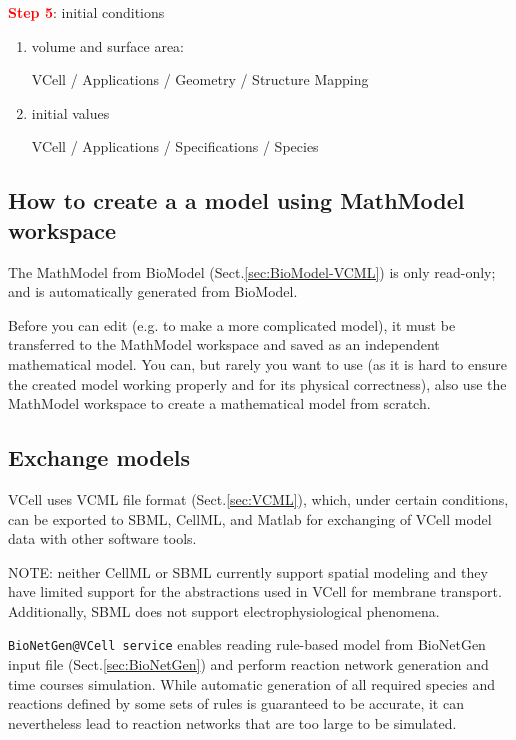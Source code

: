 \textcolor{red}{\bf Step 5}: initial conditions
\begin{enumerate}
  \item volume and surface area: 
  
VCell / Applications / Geometry / Structure Mapping

  \item initial values
  
VCell / Applications / Specifications / Species
\end{enumerate}


\subsection{How to create a a model using MathModel workspace}

The MathModel from BioModel (Sect.\ref{sec:BioModel-VCML}) is only read-only;
and is automatically generated from BioModel.

Before you can edit (e.g. to make a more complicated model), it must be
transferred to the MathModel workspace and saved as an independent mathematical
model. You can, but rarely you want to use (as it is hard to ensure the created
model working properly and for its physical correctness), also use the MathModel
workspace to create a mathematical model from scratch.




\subsection{Exchange models}

VCell uses VCML file format (Sect.\ref{sec:VCML}), which, under certain
conditions, can be exported to SBML, CellML, and Matlab for exchanging of VCell
model data with other software tools.

NOTE: neither CellML or SBML currently support spatial modeling and they have
limited support for the abstractions used in VCell for membrane transport.
Additionally, SBML does not support electrophysiological phenomena.

\verb!BioNetGen@VCell service! enables reading rule-based model from BioNetGen
input file (Sect.\ref{sec:BioNetGen}) and perform reaction network generation
and time courses simulation. While automatic generation of all required species
and reactions defined by some sets of rules is guaranteed to be accurate, it can
nevertheless lead to reaction networks that are too large to be simulated.

